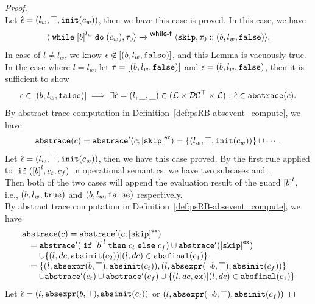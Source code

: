 \begin{proof}
\[      \]
      Let $\hat{\mathtt{\epsilon}{}} = (l_w, \top, \mathtt{init}(c_w))$, then we have this case is proved.
    In this case, we have
    \[
      \config{{\ewhile \clabel{b}^{l_w} \edo (c_w), \trace_0}}
      \xrightarrow{}^\rname{while-f}
      \config{{
      \eskip,
      \trace_0 :: (b, l_w, \efalse)}}.
    \]
    In case of $l \neq l_w$, we know $\mathtt{\epsilon} \not\in [(b, l_w, \mathtt{false})]$, and this Lemma is vacuously true.
    \\
    In the case where $l = l_w$, 
    let $\mathtt{\tau} = [(b, l_w, \mathtt{false})]$ and $\mathtt{\epsilon} = (b, l_w, \mathtt{false})$,
    then it is sufficient to show
      \[
        \mathtt{\epsilon} \in [(b, l_w, \mathtt{false})]
        \implies
        \exists \hat{\mathtt{\epsilon}{}} = (l, \_, \_) \in (\mathcal{L}\times \mathcal{DC}^{\top} \times \mathcal{L}) ~.~ 
        \hat{\mathtt{\epsilon}{}} \in \mathtt{abs}{\mathtt{trace}}(c).
      \]
        By abstract trace computation in Definition~\ref{def:psRB-absevent_compute}, we have
    \[
      \absflow(c) = \absflow'(c; \clabel{\eskip}^{\lex}) = \{(l_w, \top, \init(c_w))\} \cup \cdots.
    \]
    Let $\hat{\mathtt{\epsilon}{}} = (l_w, \top, \mathtt{init}(c_w))$, then we have this case proved.
    By the first rule applied to $\eif(\clabel{b}^l, c_t, c_f)$ in operational semantics,
    we have two subcases  and .
    \\
    Then both of the two cases will append the evaluation result of the guard $\clabel{b}^l$, i.e., $(b, l_w, \mathtt{true})$ and $(b, l_w, \mathtt{false})$ respectively.
    \\
    By abstract trace computation in Definition~\ref{def:psRB-absevent_compute}, we have
    \[
      \begin{array}{l}
        \absflow(c) = \absflow'(c; \clabel{\eskip}^{\lex}) 
        \\ \quad
        = \absflow'(\eif \clabel{b}^l \ethen c_t \eelse c_f) \cup \absflow'(\clabel{\eskip}^{\lex}) 
        \\ \quad \quad 
        \cup \{ (l, dc, \absinit(c_2)) | (l, dc) \in \absfinal(c_1) \} 
        \\ \quad  
        = \{(l, \absexpr(\bexpr, \top),  \absinit(c_t) ) ,  (l, \absexpr(\neg\bexpr, \top), \absinit(c_f)) \}
        \\ \quad \quad 
        \cup \absflow'(c_t) \cup \absflow'(c_f) 
        \cup \{ (l, dc, \lex) | (l, dc) \in \absfinal(c_1) \} 
     \end{array}
    \]
    Let $\hat{\mathtt{\epsilon}{}} = (l, \mathtt{abs}{\mathtt{expr}}(b, \top),  \mathtt{abs}{\mathtt{init}}(c_t) ) $ or $ (l, \mathtt{abs}{\mathtt{expr}}(\neg b, \top), \mathtt{abs}{\mathtt{init}}(c_f)) $

\end{proof}
